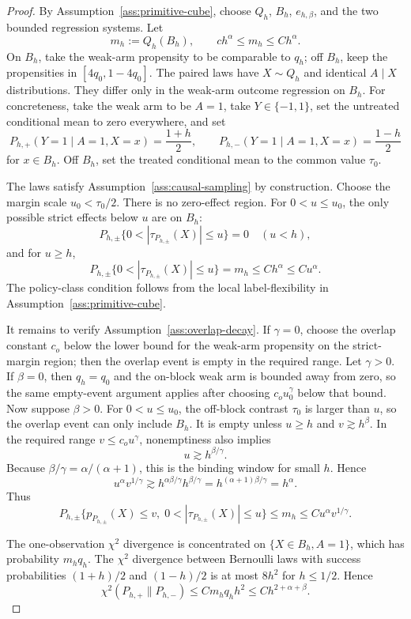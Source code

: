 \documentclass[11pt]{article}
\theoremstyle{definition}
\theoremstyle{plain}
\theoremstyle{remark}
\begin{document}
\begin{proof}
By Assumption~\ref{ass:primitive-cube}, choose \(Q_h\), \(B_h\),
\(e_{h,\beta}\), and the two bounded regression systems.  Let
\[
m_h:=Q_h(B_h),\qquad c h^\alpha\le m_h\le C h^\alpha.
\]
On \(B_h\), take the weak-arm propensity to be comparable to \(q_h\); off
\(B_h\), keep the propensities in \([4q_0,1-4q_0]\).  The paired laws have
\(X\sim Q_h\) and identical \(A\mid X\) distributions.  They differ only in
the weak-arm outcome regression on \(B_h\).  For concreteness, take the weak
arm to be \(A=1\), take \(Y\in\{-1,1\}\), set the untreated conditional mean
to zero everywhere, and set
\[
P_{h,+}(Y=1\mid A=1,X=x)=\frac{1+h}{2},\qquad
P_{h,-}(Y=1\mid A=1,X=x)=\frac{1-h}{2}
\]
for \(x\in B_h\).  Off \(B_h\), set the treated conditional mean to the
common value \(\tau_0\).

The laws satisfy Assumption~\ref{ass:causal-sampling} by construction.
Choose the margin scale \(u_0<\tau_0/2\).  There is no zero-effect region.
For \(0<u\le u_0\), the only possible strict effects below \(u\) are on
\(B_h\):
\[
P_{h,\pm}\{0<|\tau_{P_{h,\pm}}(X)|\le u\}=0
\quad (u<h),
\]
and for \(u\ge h\),
\[
P_{h,\pm}\{0<|\tau_{P_{h,\pm}}(X)|\le u\}=m_h
\le C h^\alpha\le C u^\alpha.
\]
The policy-class condition follows from the local label-flexibility in
Assumption~\ref{ass:primitive-cube}.

It remains to verify Assumption~\ref{ass:overlap-decay}.  If \(\gamma=0\),
choose the overlap constant \(c_o\) below the lower bound for the weak-arm
propensity on the strict-margin region; then the overlap event is empty in
the required range.  Let \(\gamma>0\).  If \(\beta=0\), then \(q_h=q_0\) and
the on-block weak arm is bounded away from zero, so the same empty-event
argument applies after choosing \(c_o u_0^\gamma\) below that bound.  Now
suppose \(\beta>0\).  For \(0<u\le u_0\), the off-block contrast \(\tau_0\)
is larger than \(u\), so the overlap event can only include \(B_h\).  It is
empty unless \(u\ge h\) and \(v\gtrsim h^\beta\).  In the required range
\(v\le c_o u^\gamma\), nonemptiness also implies
\[
u\gtrsim h^{\beta/\gamma}.
\]
Because \(\beta/\gamma=\alpha/(\alpha+1)\), this is the binding window for
small \(h\).  Hence
\[
u^\alpha v^{1/\gamma}
\gtrsim h^{\alpha\beta/\gamma}h^{\beta/\gamma}
=h^{(\alpha+1)\beta/\gamma}
=h^\alpha.
\]
Thus
\[
P_{h,\pm}\{p_{P_{h,\pm}}(X)\le v,\;0<|\tau_{P_{h,\pm}}(X)|\le u\}
\le m_h
\le C u^\alpha v^{1/\gamma}.
\]

The one-observation \(\chi^2\) divergence is concentrated on
\(\{X\in B_h,A=1\}\), which has probability \(m_h q_h\).  The \(\chi^2\)
divergence between Bernoulli laws with success probabilities \((1+h)/2\) and
\((1-h)/2\) is at most \(8h^2\) for \(h\le1/2\).  Hence
\[
\chi^2(P_{h,+}\|P_{h,-})
\le C m_h q_h h^2
\le C h^{2+\alpha+\beta}.
\]


\end{proof}
\end{document}
